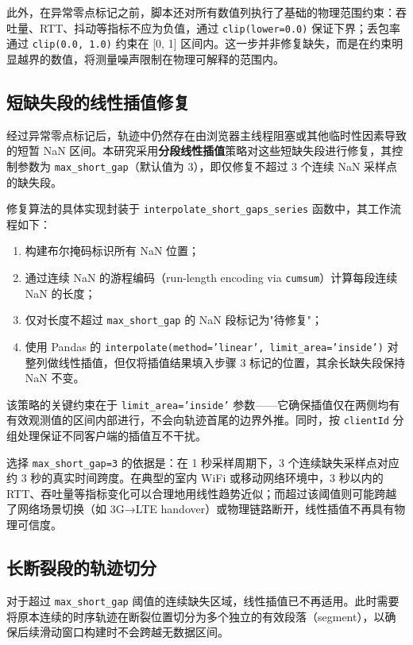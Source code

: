 此外，在异常零点标记之前，脚本还对所有数值列执行了基础的物理范围约束：吞吐量、RTT、抖动等指标不应为负值，通过 \texttt{clip(lower=0.0)} 保证下界；丢包率通过 \texttt{clip(0.0, 1.0)} 约束在 [0, 1] 区间内。这一步并非修复缺失，而是在约束明显越界的数值，将测量噪声限制在物理可解释的范围内。

\subsection{短缺失段的线性插值修复}

经过异常零点标记后，轨迹中仍然存在由浏览器主线程阻塞或其他临时性因素导致的短暂 NaN 区间。本研究采用\textbf{分段线性插值}策略对这些短缺失段进行修复，其控制参数为 \texttt{max\_short\_gap}（默认值为 3），即仅修复不超过 3 个连续 NaN 采样点的缺失段。

修复算法的具体实现封装于 \texttt{interpolate\_short\_gaps\_series} 函数中，其工作流程如下：

\begin{enumerate}
    \item 构建布尔掩码标识所有 NaN 位置；
    \item 通过连续 NaN 的游程编码（run-length encoding via \texttt{cumsum}）计算每段连续 NaN 的长度；
    \item 仅对长度不超过 \texttt{max\_short\_gap} 的 NaN 段标记为"待修复"；
    \item 使用 Pandas 的 \texttt{interpolate(method='linear', limit\_area='inside')} 对整列做线性插值，但仅将插值结果填入步骤 3 标记的位置，其余长缺失段保持 NaN 不变。
\end{enumerate}

该策略的关键约束在于 \texttt{limit\_area='inside'} 参数——它确保插值仅在两侧均有有效观测值的区间内部进行，不会向轨迹首尾的边界外推。同时，按 \texttt{clientId} 分组处理保证不同客户端的插值互不干扰。

选择 \texttt{max\_short\_gap=3} 的依据是：在 1 秒采样周期下，3 个连续缺失采样点对应约 3 秒的真实时间跨度。在典型的室内 WiFi 或移动网络环境中，3 秒以内的 RTT、吞吐量等指标变化可以合理地用线性趋势近似；而超过该阈值则可能跨越了网络场景切换（如 3G→LTE handover）或物理链路断开，线性插值不再具有物理可信度。

\subsection{长断裂段的轨迹切分}

对于超过 \texttt{max\_short\_gap} 阈值的连续缺失区域，线性插值已不再适用。此时需要将原本连续的时序轨迹在断裂位置切分为多个独立的有效段落（segment），以确保后续滑动窗口构建时不会跨越无数据区间。

